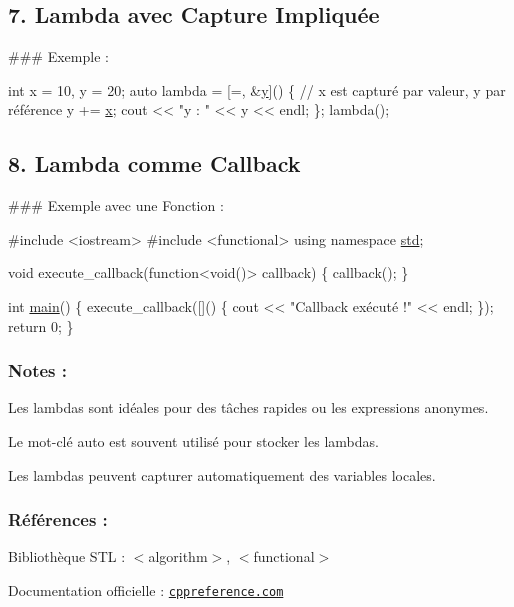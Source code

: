 \subsection*{7. Lambda avec Capture Impliquée}

\#\#\# Exemple \+: 
\begin{DoxyCode}
\textcolor{keywordtype}{int} x = 10, y = 20;
\textcolor{keyword}{auto} lambda = [=, &\hyperlink{addition_8c_a0a2f84ed7838f07779ae24c5a9086d33}{y}]() \{
    \textcolor{comment}{// x est capturé par valeur, y par référence}
    y += \hyperlink{addition_8c_a6150e0515f7202e2fb518f7206ed97dc}{x};
    cout << \textcolor{stringliteral}{"y : "} << y << endl;
\};
lambda();
\end{DoxyCode}
 



\subsection*{8. Lambda comme Callback}

\#\#\# Exemple avec une Fonction \+: 
\begin{DoxyCode}
\textcolor{preprocessor}{#include <iostream>}
\textcolor{preprocessor}{#include <functional>}
\textcolor{keyword}{using namespace }\hyperlink{namespacestd}{std};

\textcolor{keywordtype}{void} execute\_callback(\textcolor{keyword}{function}<\textcolor{keywordtype}{void}()> callback) \{
    callback();
\}

\textcolor{keywordtype}{int} \hyperlink{htop_8c_a3c04138a5bfe5d72780bb7e82a18e627}{main}() \{
    execute\_callback([]() \{
        cout << \textcolor{stringliteral}{"Callback exécuté !"} << endl;
    \});
    \textcolor{keywordflow}{return} 0;
\}
\end{DoxyCode}
 



\subsubsection*{Notes \+:}


\begin{DoxyEnumerate}
\item Les lambdas sont idéales pour des tâches rapides ou les expressions anonymes.
\item Le mot-\/clé {\ttfamily auto} est souvent utilisé pour stocker les lambdas.
\item Les lambdas peuvent capturer automatiquement des variables locales. 


\end{DoxyEnumerate}

\subsubsection*{Références \+:}


\begin{DoxyItemize}
\item Bibliothèque S\+TL \+: {\ttfamily $<$algorithm$>$}, {\ttfamily $<$functional$>$}
\item Documentation officielle \+: \href{https://en.cppreference.com}{\tt cppreference.\+com} 
\end{DoxyItemize}